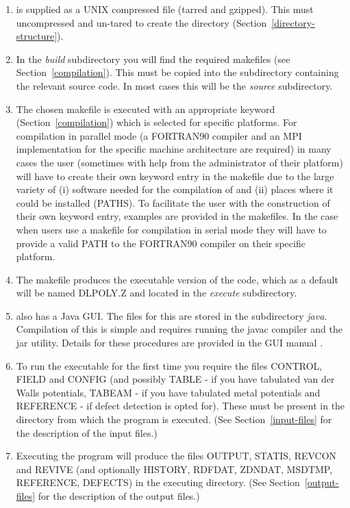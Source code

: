 \begin{enumerate}
\item \D is supplied as a UNIX compressed file (tarred and
gzipped).  This must uncompressed and un-tared to create the \D
directory (Section~\ref{directory-structure}).

\item In the {\em build} subdirectory you will find the required
\D makefiles (see Section~\ref{compilation}).  This must be
copied into the subdirectory containing the relevant source code. In
most cases this will be the {\em source} subdirectory.

\item The chosen makefile is executed with an appropriate keyword
(Section~\ref{compilation}) which is selected for specific platforms.
For \D compilation in parallel mode (a FORTRAN90 compiler
and an MPI implementation for the specific machine architecture are
required) in many cases the user (sometimes with help from the
administrator of their platform) will have to create their own
keyword entry in the makefile due to the large variety of (i)
software needed for the compilation of \D and (ii) places where
it could be installed (PATHS).  To facilitate the user with the
construction of their own keyword entry, examples are provided
in the makefiles.  In the case when users use a makefile for \D
compilation in serial mode they will have to provide a valid
PATH to the FORTRAN90 compiler on their specific platform.

\item The makefile produces the executable version of the code,
which as a default will be named DLPOLY.Z and located in the {\em
execute} subdirectory.

\item \D also has a Java GUI.  The files for this are stored
in the subdirectory {\em java}.  Compilation of this is simple and
requires running the javac compiler and the jar utility.  Details
for these procedures are provided in the GUI manual \cite{smith-gui}.

\item To run the executable for the first time you require the files
CONTROL, FIELD and CONFIG (and possibly TABLE - if you have
tabulated van der Walls potentials, TABEAM - if you have
tabulated metal potentials and REFERENCE - if defect detection is opted
for).  These must be present in the directory from which the program
is executed. (See Section~\ref{input-files} for the description of
the input files.)

\item Executing the program will produce the files OUTPUT, STATIS,
REVCON and REVIVE (and optionally HISTORY, RDFDAT, ZDNDAT, MSDTMP,
REFERENCE, DEFECTS) in the executing directory.
(See Section~\ref{output-files} for the description of the output files.)
\end{enumerate}

